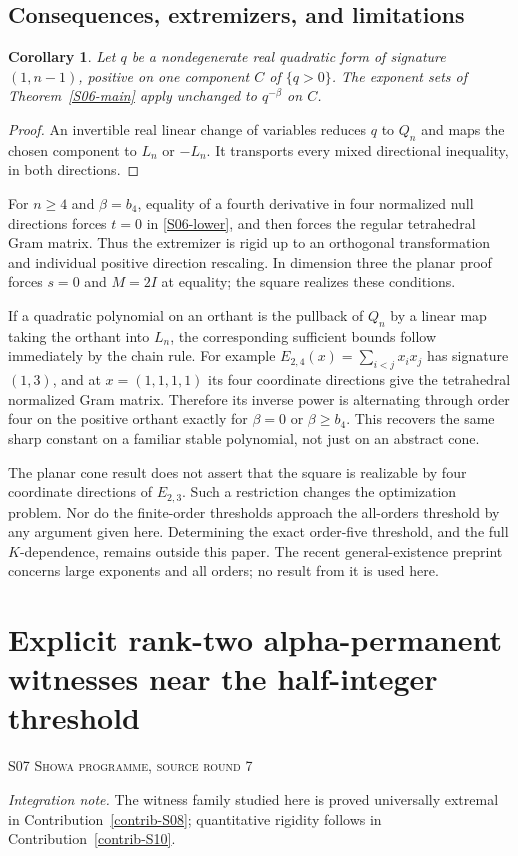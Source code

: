 \documentclass[11pt,a4paper]{article}
\newtheorem{corollary}[theorem]{Corollary}
\theoremstyle{definition}\newtheorem{definition}[theorem]{Definition}
\theoremstyle{remark}\newtheorem{remark}[theorem]{Remark}
\numberwithin{equation}{section}
\begin{document}
\subsection{Consequences, extremizers, and limitations}\label{S06-sec-5}
\begin{corollary}\label{S06-quad}
Let $q$ be a nondegenerate real quadratic form of signature $(1,n-1)$, positive on one component $C$ of $\{q>0\}$. The exponent sets of Theorem~\ref{S06-main} apply unchanged to $q^{-\beta}$ on $C$.
\end{corollary}
\begin{proof}
An invertible real linear change of variables reduces $q$ to $Q_n$ and maps the chosen component to $L_n$ or $-L_n$. It transports every mixed directional inequality, in both directions.
\end{proof}
For $n\ge4$ and $\beta=b_4$, equality of a fourth derivative in four normalized null directions forces $t=0$ in \eqref{S06-lower}, and then forces the regular tetrahedral Gram matrix. Thus the extremizer is rigid up to an orthogonal transformation and individual positive direction rescaling. In dimension three the planar proof forces $s=0$ and $M=2I$ at equality; the square realizes these conditions.

If a quadratic polynomial on an orthant is the pullback of $Q_n$ by a linear map taking the orthant into $L_n$, the corresponding sufficient bounds follow immediately by the chain rule. For example $E_{2,4}(x)=\sum_{i<j}x_ix_j$ has signature $(1,3)$, and at $x=(1,1,1,1)$ its four coordinate directions give the tetrahedral normalized Gram matrix. Therefore its inverse power is alternating through order four on the positive orthant exactly for $\beta=0$ or $\beta\ge b_4$. This recovers the same sharp constant on a familiar stable polynomial, not just on an abstract cone.

The planar cone result does not assert that the square is realizable by four coordinate directions of $E_{2,3}$. Such a restriction changes the optimization problem. Nor do the finite-order thresholds approach the all-orders threshold by any argument given here. Determining the exact order-five threshold, and the full $K$-dependence, remains outside this paper. The recent general-existence preprint \cite{ref008} concerns large exponents and all orders; no result from it is used here.




\clearpage
\section[S07 --- Explicit rank-two alpha-permanent witnesses near the half-integer threshold]{Explicit rank-two alpha-permanent witnesses near the half-integer threshold}\label{contrib-S07}
\noindent\textsc{S07 \quad Showa programme, source round 7}\par\medskip
\noindent\textit{Integration note.} The witness family studied here is proved universally extremal in Contribution~\ref{contrib-S08}; quantitative rigidity follows in Contribution~\ref{contrib-S10}.\par\medskip
\end{document}
